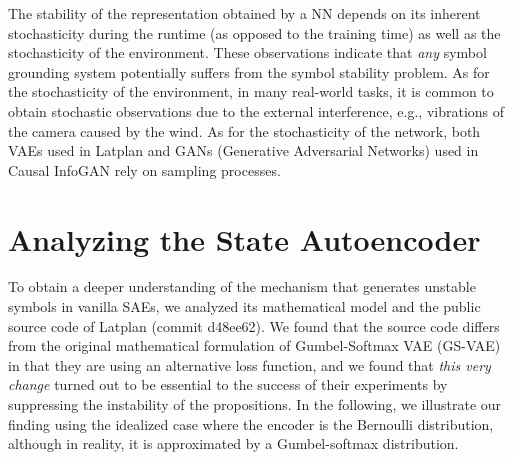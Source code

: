 The stability of the representation obtained by a NN depends
on
its inherent stochasticity during the runtime (as opposed to the training time) as well as
the stochasticity of the environment.
% 
These observations indicate that \emph{any} symbol grounding system potentially suffers from 
the symbol stability problem.
% 
As for the stochasticity of the environment,
in many real-world tasks, it is common to obtain stochastic observations
due to the external interference, e.g., vibrations of the camera caused by the wind.
% 
As for the stochasticity of the network,
both
VAEs \cite{kingma2013auto,jang2016categorical,higgins2016beta} used in Latplan
and
GANs (Generative Adversarial Networks) \cite{goodfellow2014generative} used in Causal InfoGAN \cite{kurutach2018learning}
rely on sampling processes.

\section{Analyzing the State Autoencoder}
\label{analysis}

To obtain a deeper understanding of the mechanism that generates
unstable symbols in vanilla SAEs, we
analyzed its mathematical model and the public source code of Latplan (commit d48ee62).
% 
We found that the source code differs from the original mathematical formulation of Gumbel-Softmax VAE (GS-VAE)
in that they are using an alternative loss function,
and we found that \emph{this very change} turned out to be essential to the success of their experiments
by suppressing the instability of the propositions.
In the following, we illustrate our finding using the idealized case where the encoder is the Bernoulli distribution,
although in reality, it is approximated by a Gumbel-softmax distribution.


